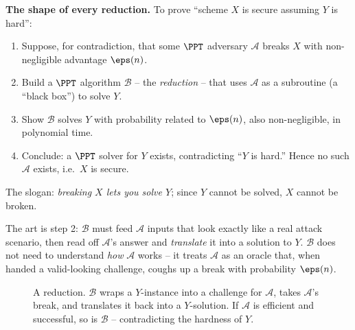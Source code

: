 \begin{focusbox}
\textbf{The shape of every reduction.} To prove ``scheme $X$ is secure assuming $Y$ is hard'':
\begin{enumerate}
\item Suppose, for contradiction, that some $\PPT$ adversary $\mathcal A$ breaks $X$ with non-negligible advantage $\eps(n)$.
\item Build a $\PPT$ algorithm $\mathcal B$ -- the \emph{reduction} -- that uses $\mathcal A$ as a subroutine (a ``black box'') to solve $Y$.
\item Show $\mathcal B$ solves $Y$ with probability related to $\eps(n)$, also non-negligible, in polynomial time.
\item Conclude: a $\PPT$ solver for $Y$ exists, contradicting ``$Y$ is hard.'' Hence no such $\mathcal A$ exists, i.e.\ $X$ is secure.
\end{enumerate}
The slogan: \emph{breaking $X$ lets you solve $Y$}; since $Y$ cannot be solved, $X$ cannot be broken.
\end{focusbox}

The art is step 2: $\mathcal B$ must feed $\mathcal A$ inputs that look exactly like a real attack scenario, then read off $\mathcal A$'s answer and \emph{translate} it into a solution to $Y$. $\mathcal B$ does not need to understand \emph{how} $\mathcal A$ works -- it treats $\mathcal A$ as an oracle that, when handed a valid-looking challenge, coughs up a break with probability $\eps(n)$.

\begin{figure}[H]
\centering
{}
\caption{A reduction. $\mathcal B$ wraps a $Y$-instance into a challenge for $\mathcal A$, takes $\mathcal A$'s break, and translates it back into a $Y$-solution. If $\mathcal A$ is efficient and successful, so is $\mathcal B$ -- contradicting the hardness of $Y$.}
\label{ch08:fig-reduction}
\end{figure}

